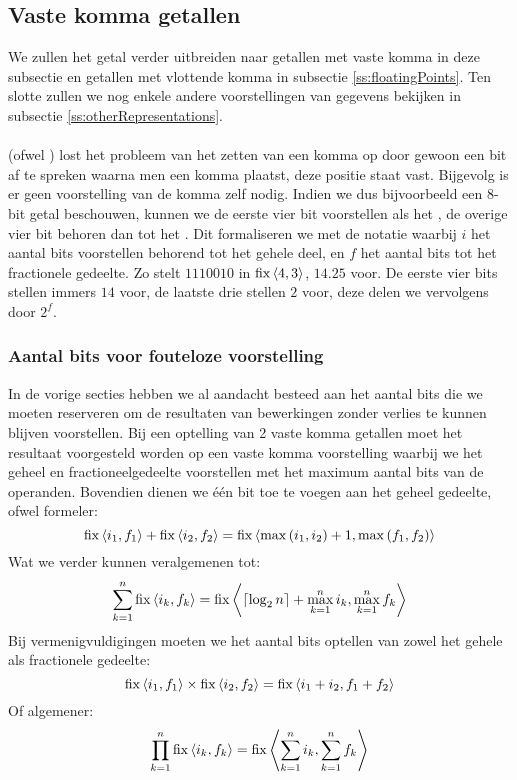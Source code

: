 \subsection{Vaste komma getallen}
We zullen het getal verder uitbreiden naar getallen met vaste komma in deze subsectie en getallen met vlottende komma in subsectie \ref{ss:floatingPoints}. Ten slotte zullen we nog enkele andere voorstellingen van gegevens bekijken in subsectie \ref{ss:otherRepresentations}.
\paragraph{}
 (ofwel ) lost het probleem van het zetten van een komma op door gewoon een bit af te spreken waarna men een komma plaatst, deze positie staat vast. Bijgevolg is er geen voorstelling van de komma zelf nodig. Indien we dus bijvoorbeeld een 8-bit getal beschouwen, kunnen we de eerste vier bit voorstellen als het , de overige vier bit behoren dan tot het . Dit formaliseren we met de notatie  waarbij $i$ het aantal bits voorstellen behorend tot het gehele deel, en $f$ het aantal bits tot het fractionele gedeelte. Zo stelt $1110010$ in $\operatorname{fix}\left<4,3\right>$, $14.25$ voor. De eerste vier bits stellen immers $14$ voor, de laatste drie stellen $2$ voor, deze delen we vervolgens door $2^f$.
\subsubsection{Aantal bits voor fouteloze voorstelling}
In de vorige secties hebben we al aandacht besteed aan het aantal bits die we moeten reserveren om de resultaten van bewerkingen zonder verlies te kunnen blijven voorstellen. Bij een optelling van 2 vaste komma getallen moet het resultaat voorgesteld worden op een vaste komma voorstelling waarbij we het geheel en fractioneelgedeelte voorstellen met het maximum aantal bits van de operanden. Bovendien dienen we \'e\'en bit toe te voegen aan het geheel gedeelte, ofwel formeler:
\begin{equation}
\operatorname{fix}\left<i_1,f_1\right>+\operatorname{fix}\left<i_2,f_2\right>=\operatorname{fix}\left<\max\left(i_1,i_2\right)+1,\max\left(f_1,f_2\right)\right>
\end{equation}
Wat we verder kunnen veralgemenen tot:
\begin{equation}
\displaystyle\sum_{k=1}^{n}{\operatorname{fix}\left<i_k,f_k\right>}=\operatorname{fix}\left<\left\lceil\log_2n\right\rceil+\max_{k=1}^{n}{i_k},\max_{k=1}^{n}{f_k}\right>
\end{equation}
Bij vermenigvuldigingen moeten we het aantal bits optellen van zowel het gehele als fractionele gedeelte:
\begin{equation}
\operatorname{fix}\left<i_1,f_1\right>\times\operatorname{fix}\left<i_2,f_2\right>=\operatorname{fix}\left<i_1+i_2,f_1+f_2\right>
\end{equation}
Of algemener:
\begin{equation}
\displaystyle\prod_{k=1}^{n}{\operatorname{fix}\left<i_k,f_k\right>}=\operatorname{fix}\left<\displaystyle\sum_{k=1}^{n}{i_k},\displaystyle\sum_{k=1}^{n}{f_k}\right>
\end{equation}
